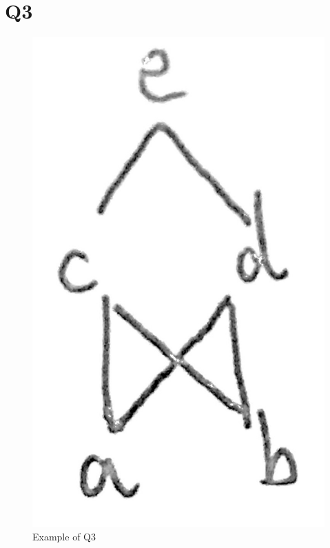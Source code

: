 \documentclass[12pt]{article}
\begin{document}
\section{Q3}
\begin{figure}[H]
\centering
\includegraphics[scale=0.1]{P2.jpg}
\caption{Example of Q3}
\end{figure}
\end{document}
